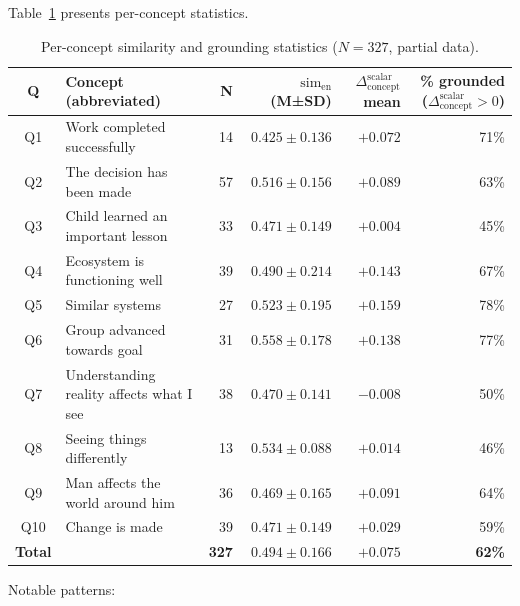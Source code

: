 \documentclass[12pt,a4paper]{article}
\newcommand{\simEN}{\ensuremath{\mathrm{sim}_{\text{en}}}}
\newcommand{\SACs}{\ensuremath{\Delta_{\text{concept}}^{\text{scalar}}}}
\begin{document}
Table~\ref{tab:per_concept} presents per-concept statistics.

\begin{table}[H]
\centering
\caption{Per-concept similarity and grounding statistics ($N=327$, partial data).}
\label{tab:per_concept}
\small
\begin{tabular}{clrrrr}
\toprule
\textbf{Q} & \textbf{Concept (abbreviated)} & \textbf{N} & \textbf{\simEN{} (M±SD)} & \textbf{\SACs{} mean} & \textbf{\% grounded (\SACs{}$>0$)} \\
\midrule
Q1  & Work completed successfully              & 14 & $0.425 \pm 0.136$ & $+0.072$ & 71\% \\
Q2  & The decision has been made               & 57 & $0.516 \pm 0.156$ & $+0.089$ & 63\% \\
Q3  & Child learned an important lesson        & 33 & $0.471 \pm 0.149$ & $+0.004$ & 45\% \\
Q4  & Ecosystem is functioning well            & 39 & $0.490 \pm 0.214$ & $+0.143$ & 67\% \\
Q5  & Similar systems                          & 27 & $0.523 \pm 0.195$ & $+0.159$ & 78\% \\
Q6  & Group advanced towards goal              & 31 & $0.558 \pm 0.178$ & $+0.138$ & 77\% \\
Q7  & Understanding reality affects what I see & 38 & $0.470 \pm 0.141$ & $-0.008$ & 50\% \\
Q8  & Seeing things differently                & 13 & $0.534 \pm 0.088$ & $+0.014$ & 46\% \\
Q9  & Man affects the world around him         & 36 & $0.469 \pm 0.165$ & $+0.091$ & 64\% \\
Q10 & Change is made                           & 39 & $0.471 \pm 0.149$ & $+0.029$ & 59\% \\
\midrule
\textbf{Total} & & \textbf{327} & $\mathbf{0.494 \pm 0.166}$ & $\mathbf{+0.075}$ & \textbf{62\%} \\
\bottomrule
\end{tabular}
\end{table}

Notable patterns:
\end{document}
